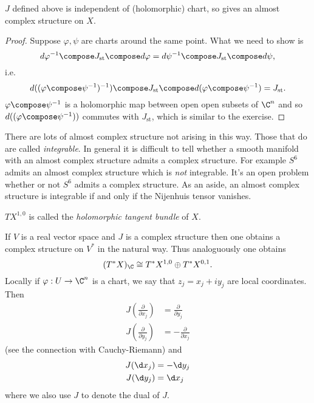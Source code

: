 \documentclass[a4paper]{article}
\begin{document}
\begin{proposition}
  \(J\) defined above is independent of (holomorphic) chart, so gives an almost complex structure on \(X\).
\end{proposition}

\begin{proof}
  Suppose \(\varphi, \psi\) are charts around the same point. What we need to show is
  \[
    d\varphi^{-1} \compose J_{\text{st}} \compose d\varphi = d\psi^{-1} \compose J_{\text{st}} \compose d \psi,
  \]
  i.e.
  \[
    d((\varphi \compose \psi^{-1})^{-1}) \compose J_{\text{st}} \compose d(\varphi \compose \psi^{-1}) = J_{\text{st}}.
  \]
  \(\varphi \compose \psi^{-1}\) is a holomorphic map between open open subsets of \(\C^n\) and so \(d((\varphi \compose \psi^{-1}))\) commutes with \(J_{\text{st}}\), which is similar to the exercise.
\end{proof}

\begin{remark}
  There are lots of almost complex structure not arising in this way. Those that do are called \emph{integrable}. In general it is difficult to tell whether a smooth manifold with an almost complex structure admits a complex structure. For example \(S^6\) admits an almost complex structure which is \emph{not} integrable. It's an open problem whether or not \(S^6\) admits a complex structure. As an aside, an almost complex structure is integrable if and only if the Nijenhuis tensor vanishes.
\end{remark}

\begin{definition}
  \(TX^{1, 0}\) is called the \emph{holomorphic tangent bundle} of \(X\).
\end{definition}

If \(V\) is a real vector space and \(J\) is a complex structure then one obtains a complex structure on \(V^*\) in the natural way. Thus analoguously one obtains
\[
  (T^*X)_\C \cong T^*X^{1, 0} \oplus T^*X^{0, 1}.
\]
Locally if \(\varphi: U \to \C^n\) is a chart, we say that \(z_j = x_j + iy_j\) are local coordinates. Then
\begin{align*}
  J(\frac{\partial  }{\partial x_j}) &= \frac{\partial  }{\partial y_j} \\
  J(\frac{\partial  }{\partial y_j}) &= - \frac{\partial  }{\partial x_j}
\end{align*}
(see the connection with Cauchy-Riemann) and
\begin{align*}
  J(\d x_j) &= -\d y_j \\
  J(\d y_j) &= \d x_j
\end{align*}
where we also use \(J\) to denote the dual of \(J\).
\end{document}
